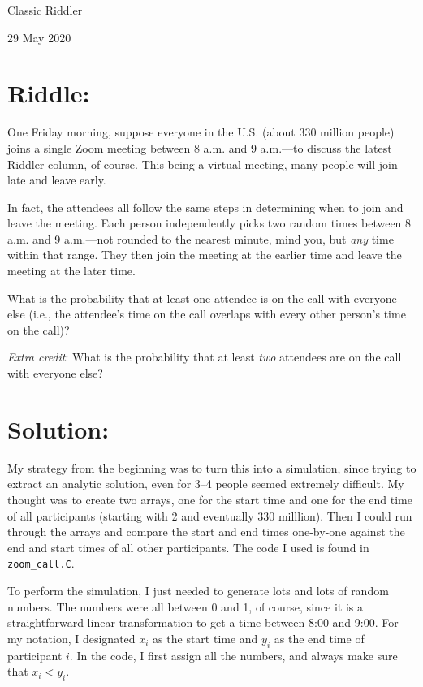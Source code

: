 \documentclass{article}
\begin{document}
\pagestyle{empty} %

\begin{center}
{\LARGE Classic Riddler}

\vspace{0.15in}

{\Large 29 May 2020}
\end{center}


\section*{Riddle:}

One Friday morning, suppose everyone in the U.S. (about 330 million people) joins a single Zoom meeting between 8 a.m. and 9 a.m.—to discuss the latest Riddler column, of course.
This being a virtual meeting, many people will join late and leave early.

In fact, the attendees all follow the same steps in determining when to join and leave the meeting. Each person independently picks two random times between 8 a.m. and 9 a.m.—not rounded to the nearest minute, mind you, but \textit{any} time within that range.
They then join the meeting at the earlier time and leave the meeting at the later time.

What is the probability that at least one attendee is on the call with everyone else (i.e., the attendee's time on the call overlaps with every other person's time on the call)?

\textit{Extra credit}: What is the probability that at least \textit{two} attendees are on the call with everyone else?

\section*{Solution:}

My strategy from the beginning was to turn this into a simulation, since trying to extract an analytic solution, even for 3--4 people seemed extremely difficult.
My thought was to create two arrays, one for the start time and one for the end time of all participants (starting with 2 and eventually 330 milllion).
Then I could run through the arrays and compare the start and end times one-by-one against the end and start times of all other participants.
The code I used is found in \texttt{zoom\_call.C}.

To perform the simulation, I just needed to generate lots and lots of random numbers.
The numbers were all between 0 and 1, of course, since it is a straightforward linear transformation to get a time between 8:00 and 9:00.
For my notation, I designated $x_{i}$ as the start time and $y_{i}$ as the end time of participant $i$.
In the code, I first assign all the numbers, and always make sure that  $x_{i}<y_{i}$.
\end{document}
